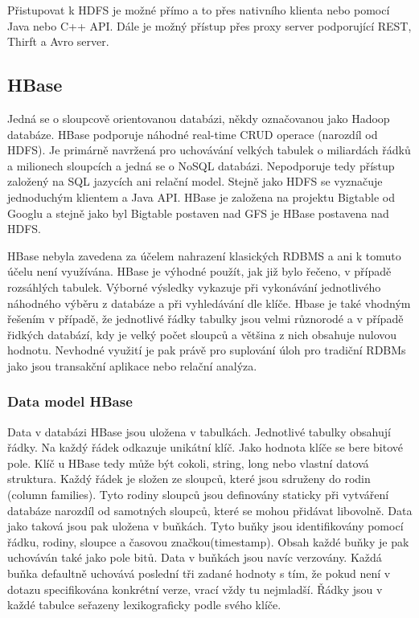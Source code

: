 \documentclass[thesis=M,czech]{FITthesis}[2012/06/26]
\begin{document}
Přistupovat k HDFS je možné přímo a to přes nativního klienta nebo pomocí Java nebo C++ API. Dále je možný přístup přes proxy server podporující REST, Thirft a Avro server.

\subsection{HBase}
Jedná se o sloupcově orientovanou databázi, někdy označovanou jako Hadoop databáze. HBase podporuje náhodné real-time CRUD operace (narozdíl od HDFS). Je primárně navržená pro uchovávání velkých tabulek o miliardách řádků a milionech sloupcích a jedná se o NoSQL databázi. Nepodporuje tedy přístup založený na SQL jazycích ani relační model. Stejně jako HDFS se vyznačuje jednoduchým klientem a Java API. HBase je založena na projektu Bigtable od Googlu a stejně jako byl Bigtable postaven nad GFS je HBase postavena nad HDFS.\cite{HbaseDG}

HBase nebyla zavedena za účelem nahrazení klasických RDBMS a ani k tomuto účelu není využívána. HBase je výhodné použít, jak již bylo řečeno, v případě rozsáhlých tabulek. Výborné výsledky vykazuje při vykonávání jednotlivého náhodného výběru z databáze a při vyhledávání dle klíče. Hbase je také vhodným řešením v případě, že jednotlivé řádky tabulky jsou velmi různorodé a v případě řidkých databází, kdy je velký počet sloupců a většina z nich obsahuje nulovou hodnotu. Nevhodné využití je pak právě pro suplování úloh pro tradiční RDBMs jako jsou transakční aplikace nebo relační analýza.\cite{HBaseWEB}

\subsubsection{Data model HBase}


Data v databázi HBase jsou uložena v tabulkách. Jednotlivé tabulky obsahují řádky. Na každý řádek odkazuje unikátní klíč. Jako hodnota klíče se bere bitové pole. Klíč u HBase tedy může být cokoli, string, long nebo vlastní datová struktura. Každý řádek je složen ze sloupců, které jsou sdruženy do rodin (column families). Tyto rodiny sloupců jsou definovány staticky při vytváření databáze narozdíl od samotných sloupců, které se mohou přidávat libovolně. Data jako taková jsou pak uložena v buňkách. Tyto buňky jsou identifikovány pomocí řádku, rodiny, sloupce a časovou značkou(timestamp). Obsah každé buňky je pak uchováván také jako pole bitů. Data v buňkách jsou navíc verzovány. Každá buňka defaultně uchovává poslední tři zadané hodnoty s tím, že pokud není v dotazu specifikována konkrétní verze, vrací vždy tu nejmladší. Řádky jsou v každé tabulce seřazeny lexikograficky podle svého klíče.
\end{document}
